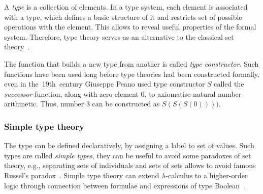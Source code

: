 \documentclass[article]{aaltoseries}
\begin{document}
A \textit{type} is a collection of elements. In a type system, each element is associated with a type, which defines a basic structure of it and restricts set of possible operations with the element. This allows to reveal useful properties of the formal system. Therefore, type theory serves as an alternative to the classical set theory~\cite{Tho91}.

The function that builds a new type from another is called \textit{type constructor}. Such functions have been used long before type theories had been constructed formally, even in the~19th~century Giuseppe Peano used type constructor $S$ called the \textit{successor} function, along with zero element 0, to axiomatise natural number arithmetic. Thus, number 3 can be constructed as $S(S(S(0))))$.


\subsubsection{Simple type theory}
The type can be defined declaratively, by assigning a label to set of values. Such types are called \textit{simple types}, they can be useful to avoid some paradoxes of set theory, e.g., separating sets of individuals and sets of sets allows to avoid famous Russel's paradox~\cite{Irv95}. Simple type theory can extend $\lambda$-calculus to a higher-order logic through connection between formulae and expressions of type Boolean~\cite{Paulson90}.



\end{document}
